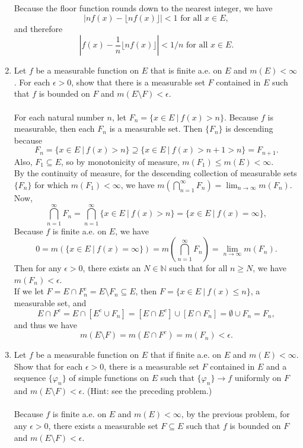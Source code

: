 \begin{enumerate}
    Because the floor function rounds down to the nearest integer, we have
    \[
        |nf(x)-\lfloor nf(x)\rfloor|<1\text{ for all }x\in E,
    \]
    and therefore
    \[
        |f(x)-\frac{1}{n}\lfloor nf(x)\rfloor|<1/n\text{ for all }x\in E.
    \]
    \item Let $f$ be a measurable function on $E$ that is finite a.e. on $E$ and $m(E)<\infty$.
    For each $\epsilon>0$, show that there is a measurable set $F$ contained in $E$ such that $f$ is bounded on $F$ and $m(E\setminus F)<\epsilon$.\\
    \\For each natural number $n$, let $F_n=\{x\in E\ |\ f(x)>n\}$. 
    Because $f$ is measurable, then each $F_n$ is a measurable set. 
    Then $\{F_n\}$ is descending because 
    \[
        F_n=\{x\in E\ |\ f(x)>n\}\supseteq\{x\in E\ |\ f(x)>n+1>n\}=F_{n+1}.
    \]
    Also, $F_1\subseteq E$, so by monotonicity of measure, $m(F_1)\le m(E)<\infty$.
    \\By the continuity of measure, for the descending collection of measurable sets $\{F_n\}$ for which $m(F_1)<\infty$, we have $m(\bigcap_{n=1}^\infty F_n)=\lim_{n\to\infty}m(F_n)$.
    \\Now, 
    \[
        \bigcap_{n=1}^\infty F_n = \bigcap_{n=1}^\infty\{x\in E\ |\ f(x)>n\}=\{x\in E\ |\ f(x)=\infty\},
    \]
    Because $f$ is finite a.e. on $E$, we have 
    \[
        0=m(\{x\in E\ |\ f(x)=\infty\})=m(\bigcap_{n=1}^\infty F_n)=\lim_{n\to\infty}m(F_n).
    \]
    Then for any $\epsilon>0$, there exists an $N\in\mathbb{N}$ such that for all $n\ge N$, we have $m(F_n)<\epsilon$.
    \\If we let $F=E\cap F_n^c=E\setminus F_n \subseteq E$, then $F=\{x\in E\ |\ f(x)\le n\}$, a measurable set, and 
    \[
        E\cap F^c=E\cap [E^c\cup F_n]=[E\cap E^c]\cup[E\cap F_n]=\emptyset\cup F_n=F_n,
    \]
    and thus we have
    \[
        m(E\setminus F)=m(E\cap F^c)=m(F_n)<\epsilon.
    \]
    \item Let $f$ be a measurable function on $E$ that if finite a.e. on $E$ and $m(E)<\infty$. 
    Show that for each $\epsilon>0$, there is a measurable set $F$ contained in $E$ and a sequence $\{\varphi_n\}$ of simple functions on $E$ such that $\{\varphi_n\}\to f$ uniformly on $F$ and $m(E\setminus F)<\epsilon$. (Hint: see the preceding problem.)\\
    \\Because $f$ is finite a.e. on $E$ and $m(E)<\infty$, by the previous problem, for any $\epsilon>0$, there exists a measurable set $F\subseteq E$ such that $f$ is bounded on $F$ and $m(E \setminus F)<\epsilon$.

\end{enumerate}
